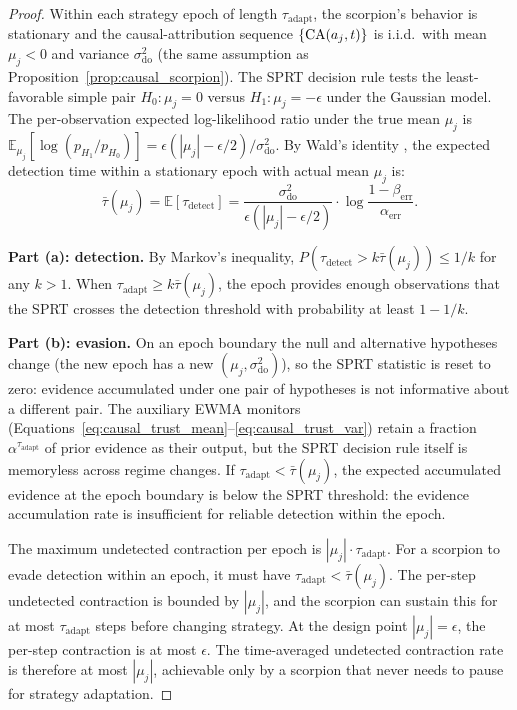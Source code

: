 \begin{proof}
Within each strategy epoch of length $\tau_{\mathrm{adapt}}$, the
scorpion's behavior is stationary and the causal-attribution sequence
$\{\mathrm{CA}(a_j, t)\}$ is i.i.d.\ with mean $\mu_j < 0$ and
variance $\sigma_{\mathrm{do}}^2$ (the same assumption as
Proposition~\ref{prop:causal_scorpion}). The SPRT decision rule
tests the least-favorable simple pair $H_0: \mu_j = 0$ versus
$H_1: \mu_j = -\epsilon$ under the Gaussian model. The
per-observation expected log-likelihood ratio under the true mean
$\mu_j$ is
$\mathbb{E}_{\mu_j}[\log(p_{H_1}/p_{H_0})] =
\epsilon(|\mu_j| - \epsilon/2) / \sigma_{\mathrm{do}}^2$. By Wald's
identity \citep{wald1945sequential}, the expected detection time
within a stationary epoch with actual mean $\mu_j$ is:
\[
\bar{\tau}(\mu_j) = \mathbb{E}[\tau_{\mathrm{detect}}]
    = \frac{\sigma_{\mathrm{do}}^2}
    {\epsilon(|\mu_j| - \epsilon/2)}
    \cdot \log\!\frac{1 - \beta_{\mathrm{err}}}{\alpha_{\mathrm{err}}}.
\]

\textbf{Part (a): detection.}
By Markov's inequality,
$P(\tau_{\mathrm{detect}} > k \bar{\tau}(\mu_j)) \leq 1/k$ for any
$k > 1$. When $\tau_{\mathrm{adapt}} \geq k \bar{\tau}(\mu_j)$, the
epoch provides enough observations that the SPRT crosses the
detection threshold with probability at least $1 - 1/k$.

\textbf{Part (b): evasion.}
On an epoch boundary the null and alternative hypotheses change
(the new epoch has a new $(\mu_j, \sigma_{\mathrm{do}}^2)$), so the
SPRT statistic is reset to zero: evidence accumulated under one
pair of hypotheses is not informative about a different pair. The
auxiliary EWMA monitors
(Equations~\eqref{eq:causal_trust_mean}--\eqref{eq:causal_trust_var})
retain a fraction $\alpha^{\tau_{\mathrm{adapt}}}$ of prior evidence
as their output, but the SPRT decision rule itself is
memoryless across regime changes. If $\tau_{\mathrm{adapt}} <
\bar{\tau}(\mu_j)$, the expected accumulated evidence at the epoch
boundary is below the SPRT threshold: the evidence accumulation
rate is insufficient for reliable detection within the epoch.

The maximum undetected contraction per epoch is
$|\mu_j| \cdot \tau_{\mathrm{adapt}}$. For a scorpion to evade
detection within an epoch, it must have
$\tau_{\mathrm{adapt}} < \bar{\tau}(\mu_j)$. The
per-step undetected contraction is bounded by $|\mu_j|$, and the
scorpion can sustain this for at most $\tau_{\mathrm{adapt}}$ steps
before changing strategy. At the design point $|\mu_j| = \epsilon$,
the per-step contraction is at most $\epsilon$. The time-averaged
undetected contraction rate is therefore at most $|\mu_j|$,
achievable only by a scorpion that never needs to pause for strategy
adaptation.
\end{proof}
